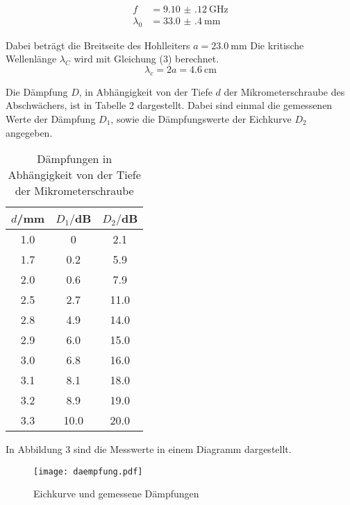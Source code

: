 \begin{align*}
  f &= \SI{9.10(12)}{\giga\hertz} \\
  \lambda_{0} &= \SI{33.0(4)}{\milli\meter}
\end{align*}

Dabei beträgt die Breitseite des Hohlleiters $a= \SI{23.0}{\milli\meter}$
Die kritische Wellenlänge $\lambda_C$ wird mit Gleichung (3) berechnet.
\begin{equation*}
  \lambda_c = 2a = \SI{4.6}{\centi\meter}
\end{equation*}

Die Dämpfung $D$, in Abhängigkeit von der Tiefe $d$ der Mikrometerschraube des Abschwächers, ist in Tabelle 2
dargestellt. Dabei sind einmal die gemessenen Werte der Dämpfung $D_1$, sowie die Dämpfungswerte der
Eichkurve $D_2$ angegeben.


\begin{table}[H]
  \centering
  \caption{Dämpfungen in Abhängigkeit von der Tiefe der Mikrometerschraube}
  \label{tab:Parameter}
  \begin{tabular}{c c c}
    \toprule
    $d$/mm & $D_1/$dB & $D_2/$dB\\
    \midrule
    1.0 &  0  & 2.1    \\
    1.7 &  0.2  & 5.9    \\
    2.0 &  0.6  & 7.9    \\
    2.5 &  2.7  & 11.0    \\
    2.8 &  4.9  & 14.0    \\
    2.9 &  6.0  & 15.0    \\
    3.0 &  6.8  & 16.0    \\
    3.1 &  8.1  & 18.0    \\
    3.2 &  8.9  & 19.0    \\
    3.3 &  10.0 & 20.0    \\
    \bottomrule
  \end{tabular}
\end{table}

In Abbildung 3 sind die Messwerte in einem Diagramm dargestellt.

\begin{figure}
  \centering
  \texttt{[image: daempfung.pdf]}
  \caption{Eichkurve und gemessene Dämpfungen}
  \label{fig:plot}
\end{figure}
